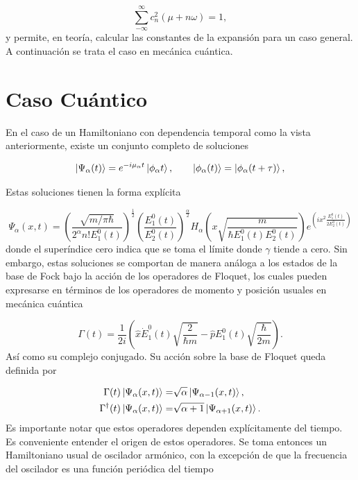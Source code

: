 \documentclass[10pt,a4paper]{report}
\begin{document}
\begin{equation}
\sum_{-\infty}^\infty c_n^2(\mu + n\omega) = 1,
\end{equation} y permite, en teoría, calcular las constantes de la expansión para un caso general. A continuación se trata el caso en mecánica cuántica.

\section{Caso Cuántico}

En el caso de un Hamiltoniano con dependencia temporal como la vista anteriormente, existe un conjunto completo de soluciones \cite{BarnettSD}

\begin{equation}
\Ket{\Psi_\alpha (t)} = e^{-i\mu_\alpha t}\Ket{\phi_\alpha t}, \qquad \Ket{\phi_\alpha (t)}=\Ket{\phi_\alpha (t+\tau)},
\end{equation}

Estas soluciones tienen la forma explícita\cite{BrownPT}

\begin{equation}
\Psi_\alpha (x,t) = (\frac{\sqrt{m/\pi\hbar}}{2^\alpha n!E_1^0(t)})^{\frac{1}{2}}(\frac{E_1^0(t)}{E_2^0(t)})^\frac{\alpha}{2}H_\alpha(x\sqrt{\frac{m}{\hbar E_1^0(t) E_2^0(t)}})e^{(ix^2\frac{E_1^0(t)}{2E_2^0(t)})}
\end{equation} donde el superíndice cero indica que se toma el límite donde $\gamma$ tiende a cero. Sin embargo, estas soluciones se comportan de manera análoga a los estados de la base de Fock bajo la acción de los operadores de Floquet, los cuales pueden expresarse en términos de los operadores de momento y posición usuales en mecánica cuántica

\begin{equation}\label{FloquetOperators}
\Gamma(t) = \frac{1}{2i}(\hat{x}\dot{E}_1^0(t)\sqrt{\frac{2}{\hbar m}}-\hat{p}E_1^0(t)\sqrt{\frac{\hbar}{2m}}).
\end{equation} Así como su complejo conjugado. Su acción sobre la base de Floquet queda definida por

\begin{align*}
\Gamma(t) \Ket{\Psi_\alpha (x,t)} =& \sqrt{\alpha}\Ket{\Psi_{\alpha-1} (x,t)}, \\
\Gamma^\dagger(t) \Ket{\Psi_\alpha (x,t)} =& \sqrt{\alpha+1}\Ket{\Psi_{\alpha+1} (x,t)}.
\end{align*}Es importante notar que estos operadores dependen explícitamente del tiempo. Es conveniente entender el origen de estos operadores. Se toma entonces un Hamiltoniano usual de oscilador armónico, con la excepción de que la frecuencia del oscilador es una función periódica del tiempo
\end{document}
